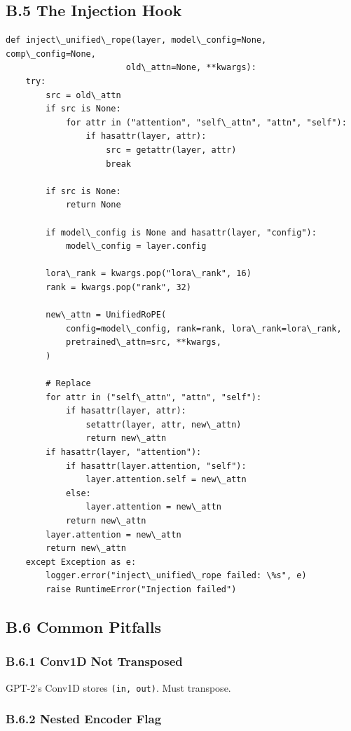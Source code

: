 \subsection{B.5 The Injection Hook}

\begin{lstlisting}
def inject\_unified\_rope(layer, model\_config=None, comp\_config=None,
                        old\_attn=None, **kwargs):
    try:
        src = old\_attn
        if src is None:
            for attr in ("attention", "self\_attn", "attn", "self"):
                if hasattr(layer, attr):
                    src = getattr(layer, attr)
                    break
        
        if src is None:
            return None
        
        if model\_config is None and hasattr(layer, "config"):
            model\_config = layer.config
        
        lora\_rank = kwargs.pop("lora\_rank", 16)
        rank = kwargs.pop("rank", 32)
        
        new\_attn = UnifiedRoPE(
            config=model\_config, rank=rank, lora\_rank=lora\_rank,
            pretrained\_attn=src, **kwargs,
        )
        
        # Replace
        for attr in ("self\_attn", "attn", "self"):
            if hasattr(layer, attr):
                setattr(layer, attr, new\_attn)
                return new\_attn
        if hasattr(layer, "attention"):
            if hasattr(layer.attention, "self"):
                layer.attention.self = new\_attn
            else:
                layer.attention = new\_attn
            return new\_attn
        layer.attention = new\_attn
        return new\_attn
    except Exception as e:
        logger.error("inject\_unified\_rope failed: \%s", e)
        raise RuntimeError("Injection failed")
\end{lstlisting}

\subsection{B.6 Common Pitfalls}

\subsubsection{B.6.1 Conv1D Not Transposed}

GPT-2's Conv1D stores \texttt{(in, out)}. Must transpose.

\subsubsection{B.6.2 Nested Encoder Flag}

